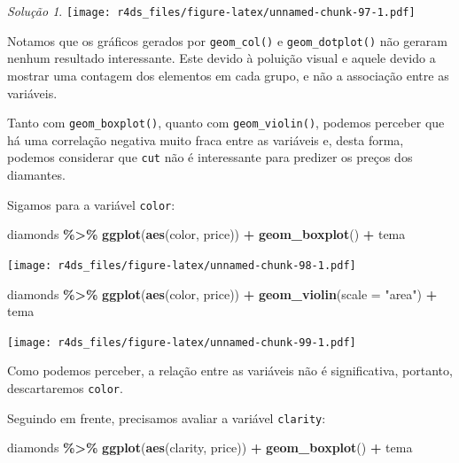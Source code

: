 \documentclass[
]{latex/krantz}
\newenvironment{Shaded}{\begin{snugshade}}{\end{snugshade}}
\newcommand{\AttributeTok}[1]{\textcolor[rgb]{0.13,0.29,0.53}{#1}}
\newcommand{\FunctionTok}[1]{\textcolor[rgb]{0.13,0.29,0.53}{\textbf{#1}}}
\newcommand{\NormalTok}[1]{#1}
\newcommand{\SpecialCharTok}[1]{\textcolor[rgb]{0.81,0.36,0.00}{\textbf{#1}}}
\newcommand{\StringTok}[1]{\textcolor[rgb]{0.31,0.60,0.02}{#1}}
\theoremstyle{definition}
\theoremstyle{definition}
\theoremstyle{definition}
\theoremstyle{definition}
\theoremstyle{remark}
\newtheorem*{solution}{Solução}
\begin{document}
\begin{solution}
\texttt{[image: r4ds\_files/figure-latex/unnamed-chunk-97-1.pdf]}

Notamos que os gráficos gerados por \texttt{geom\_col()} e \texttt{geom\_dotplot()} não geraram nenhum resultado interessante. Este devido à poluição visual e aquele devido a mostrar uma contagem dos elementos em cada grupo, e não a associação entre as variáveis.

Tanto com \texttt{geom\_boxplot()}, quanto com \texttt{geom\_violin()}, podemos perceber que há uma correlação negativa muito fraca entre as variáveis e, desta forma, podemos considerar que \texttt{cut} não é interessante para predizer os preços dos diamantes.

Sigamos para a variável \texttt{color}:

\begin{Shaded}
\begin{Highlighting}[]
\NormalTok{diamonds }\SpecialCharTok{\%\textgreater{}\%} 
    \FunctionTok{ggplot}\NormalTok{(}\FunctionTok{aes}\NormalTok{(color, price)) }\SpecialCharTok{+}
        \FunctionTok{geom\_boxplot}\NormalTok{() }\SpecialCharTok{+}
\NormalTok{        tema}
\end{Highlighting}
\end{Shaded}

\texttt{[image: r4ds\_files/figure-latex/unnamed-chunk-98-1.pdf]}

\begin{Shaded}
\begin{Highlighting}[]
\NormalTok{diamonds }\SpecialCharTok{\%\textgreater{}\%} 
    \FunctionTok{ggplot}\NormalTok{(}\FunctionTok{aes}\NormalTok{(color, price)) }\SpecialCharTok{+}
        \FunctionTok{geom\_violin}\NormalTok{(}\AttributeTok{scale =} \StringTok{"area"}\NormalTok{) }\SpecialCharTok{+}
\NormalTok{        tema}
\end{Highlighting}
\end{Shaded}

\texttt{[image: r4ds\_files/figure-latex/unnamed-chunk-99-1.pdf]}

Como podemos perceber, a relação entre as variáveis não é significativa, portanto, descartaremos \texttt{color}.

Seguindo em frente, precisamos avaliar a variável \texttt{clarity}:

\begin{Shaded}
\begin{Highlighting}[]
\NormalTok{diamonds }\SpecialCharTok{\%\textgreater{}\%} 
    \FunctionTok{ggplot}\NormalTok{(}\FunctionTok{aes}\NormalTok{(clarity, price)) }\SpecialCharTok{+}
        \FunctionTok{geom\_boxplot}\NormalTok{() }\SpecialCharTok{+}
\NormalTok{        tema}
\end{Highlighting}
\end{Shaded}


\end{solution}
\end{document}
